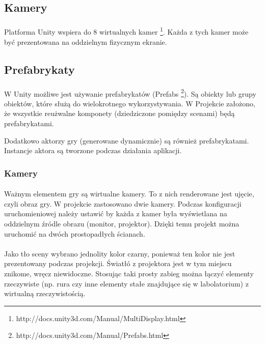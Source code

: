 \subsection{Kamery}
\paragraph{}
Platforma Unity wspiera do 8 wirtualnych kamer \footnote{http://docs.unity3d.com/Manual/MultiDisplay.html}.
Każda z tych kamer może być prezentowana na oddzielnym fizycznym ekranie.

\subsection{Prefabrykaty}
\paragraph{}
W Unity możliwe jest używanie prefabrykatów (Prefabs \footnote{http://docs.unity3d.com/Manual/Prefabs.html}). Są obiekty lub grupy obiektów, które służą do wielokrotnego wykorzystywania. W Projekcie założono, że wszystkie reużwalne komponety (dziedziczone pomiędzy scenami) będą prefabrykatami.

Dodatkowo aktorzy gry (generowane dynamicznie) są również prefabrykatami. Instancje aktora są tworzone podczas działania aplikacji.

\subsubsection{Kamery}
\paragraph{}
Ważnym elementem gry są wirtualne kamery. To z nich renderowane jest ujęcie, czyli obraz gry. W projekcie zastosowano dwie kamery. Podczas konfiguracji uruchomieniowej należy ustawić by każda z kamer była wyświetlana na oddzielnym źródle obrazu (monitor, projektor). Dzięki temu projekt można uruchomić na dwóch prostopadłych ścianach.
\paragraph{}
Jako tło sceny wybrano jednolity kolor czarny, ponieważ ten kolor nie jest prezentowany podczas projekcji. Światłó z projektora jest w tym miejscu znikome, wręcz niewidoczne. Stosując taki prosty zabieg można łączyć elementy rzeczywiste (np. rura czy inne elementy stałe znajdujące się w labolatorium) z wirtualną rzeczywistością.


